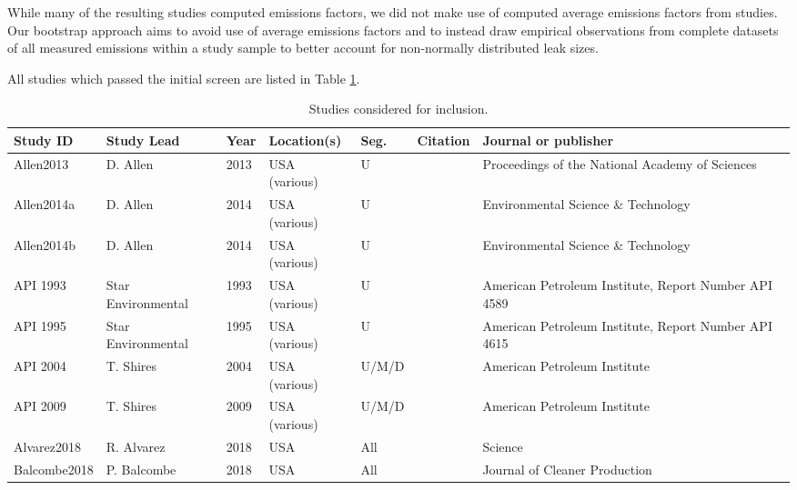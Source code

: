 \documentclass[11pt]{report}
\begin{document}
While many of the resulting studies computed emissions factors, we did not make use of computed average emissions factors from studies. Our bootstrap approach aims to avoid use of average emissions factors and to instead draw empirical observations from complete datasets of all measured emissions within a study sample to better account for non-normally distributed leak sizes.

All studies which passed the initial screen are listed in Table \ref{tab:VF_component_studies}.

\clearpage

\begin{landscape}
\begin{table}[]
\begin{scriptsize}
\caption{Studies considered for inclusion.}
\label{tab:VF_component_studies}
\begin{tabular*}{1\columnwidth}{lllllll}
\toprule
Study ID		& Study Lead   & Year & Location(s)    & Seg.  & Citation        & Journal or publisher        \\
\midrule
Allen2013         		& D. Allen     		& 2013 	& USA (various)  	& U     	& \cite{Allen2013}    & Proceedings of the National Academy of Sciences\\
Allen2014a       	 	& D. Allen     		& 2014 	& USA (various)  	& U     	& \cite{Allen2014a}  & Environmental Science \& Technology   \\
Allen2014b        	& D. Allen     		& 2014 	& USA (various)  	& U    	& \cite{Allen2014b}       & Environmental Science \& Technology   \\
API 1993		& Star Environmental     	& 1993 	& USA (various)  	& U     	& \cite{API1993a}& American Petroleum Institute, Report Number API 4589      \\
API 1995		& Star Environmental     	& 1995 	& USA (various)  	& U     	& \cite{API1995a}& American Petroleum Institute, Report Number API 4615      \\
API 2004		& T. Shires   		& 2004 	& USA (various)  	& U/M/D 	& \cite{Shires2004}        & American Petroleum Institute\\
API 2009		& T. Shires    		& 2009 	& USA (various)  	& U/M/D 	&\cite{Shires2009}         & American Petroleum Institute\\
Alvarez2018       	& R. Alvarez  		& 2018 	& USA  		& All   	& \cite{Alvarez2018}        & Science \\
Balcombe2018      	& P. Balcombe  	& 2018 	& USA  		& All   	& \cite{Balcombe2018}      & Journal of Cleaner Production         \\

\end{tabular*}
\end{scriptsize}
\end{table}
\end{landscape}
\end{document}
